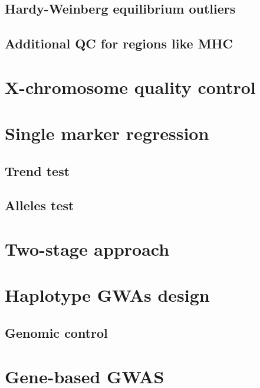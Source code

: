 \documentclass[]{book}
\theoremstyle{definition}
\theoremstyle{definition}
\theoremstyle{definition}
\theoremstyle{remark}
\begin{document}
\subsection{Hardy-Weinberg equilibrium
outliers}\label{hardy-weinberg-equilibrium-outliers}

\subsection{Additional QC for regions like
MHC}\label{additional-qc-for-regions-like-mhc}

\section{X-chromosome quality
control}\label{x-chromosome-quality-control}

\section{Single marker regression}\label{single-marker-regression}

\subsection{Trend test}\label{trend-test}

\subsection{Alleles test}\label{alleles-test}

\section{Two-stage approach}\label{two-stage-approach}

\section{Haplotype GWAs design}\label{haplotype-gwas-design}

\subsection{Genomic control}\label{genomic-control}

\section{Gene-based GWAS}\label{gene-based-gwas}
\end{document}
